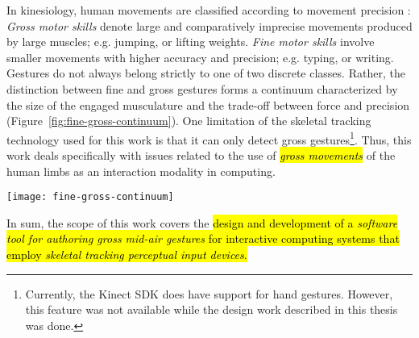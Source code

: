 In kinesiology, human movements are classified according to movement precision \parencite{Haibach:2011}: \emph{Gross motor skills} denote large and comparatively imprecise movements produced by large muscles; e.g. jumping, or lifting weights. \emph{Fine motor skills} involve smaller movements with higher accuracy and precision; e.g. typing, or writing. Gestures do not always belong strictly to one of two discrete classes. Rather, the distinction between fine and gross gestures forms a continuum characterized by the size of the engaged musculature and the trade-off between force and precision \parencite{Edwards:2010} (Figure~\ref{fig:fine-gross-continuum}). One limitation of the skeletal tracking technology used for this work is that it can only detect gross gestures\footnote{Currently, the Kinect SDK does have support for hand gestures. However, this feature was not available while the design work described in this thesis was done.}. Thus, this work deals specifically with issues related to the use of \hl{\emph{gross movements}} of the human limbs as an interaction modality in computing.

\begin{SCfigure}[\sidecaptionrelwidth][ht]
\centering
\texttt{[image: fine-gross-continuum]}
\caption{The continuum of \emph{fine} vs. \emph{gross} movements.}
\label{fig:fine-gross-continuum}
\end{SCfigure}

In sum, the scope of this work covers the \hl{design and development of a \emph{software tool for authoring gross mid-air gestures} for interactive computing systems that employ \emph{skeletal tracking perceptual input devices}.}

